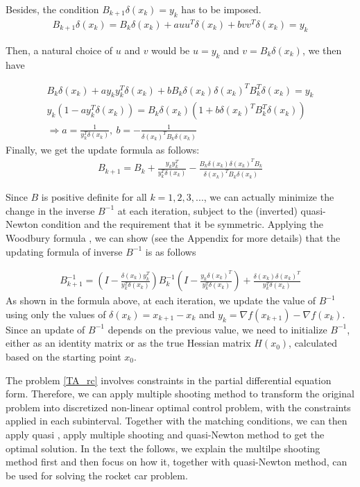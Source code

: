 Besides, the condition $B_{k+1}\delta(x_k) = y_k$ has to be imposed.
\begin{align*}
	B_{k+1}\delta(x_k) = B_k\delta(x_k)  + a u u^T\delta(x_k) + b v v^T\delta(x_k) = y_k
\end{align*}

Then, a natural choice of $u$ and $v$ would be $u=y_k$ and $v=B_k\delta(x_k)$, we then have

\begin{align*}
	B_k\delta(x_k) + a y_ky^T_k\delta(x_k) + bB_k\delta(x_k) \delta(x_k)^TB_k^T\delta(x_k) = y_k  \\
	y_k(1-ay_k^T\delta(x_k) ) = B_k\delta(x_k)(1+ b \delta(x_k)^TB_k^T\delta(x_k)) \\
	\Rightarrow a = \frac{1}{y_k^T\delta(x_k)}, \  b= - \frac{1}{\delta(x_k)^TB_k\delta(x_k)}
\end{align*}
Finally, we get the update formula as follows: 
\begin{align*}
	B_{k+1} = B_k +  \frac{y_ky_k^T}{y_k^T\delta(x_k)}  - \frac{B_k\delta(x_k)\delta(x_k)^TB_k}{\delta(x_k)^TB_k\delta(x_k)}
\end{align*}

Since $B$ is positive definite for all $k = 1,2, 3, ...$, we can actually minimize the change in the inverse $B^{-1}$ at each iteration, subject to the (inverted) quasi-Newton condition and the requirement that it be symmetric. Applying the Woodbury formula , we can show (see the Appendix for more details) that the updating formula of inverse $B^{-1}$ is as follows

\begin{align*}
	B_{k+1}^{-1} = (I - \frac{\delta(x_k)y_k^T}{y_k^T\delta(x_k)})B_k^{-1}(I - \frac{y_k\delta(x_k)^T}{y_k^T\delta(x_k)}) +  \frac{\delta(x_k)\delta(x_k)^T}{y_k^T\delta(x_k)} 
\end{align*}
As shown in the formula above, at each iteration, we update the value of $B^{-1}$ using only the values of $\delta(x_k) = x_{k+1} -x_k$ and $y_k = \nabla f(x_{k+1}) - \nabla f(x_k)$. Since an update of $B^{-1}$ depends on the previous value, we need to initialize $B^{-1}$, either as an identity matrix or as the true Hessian matrix $H(x_0)$, calculated based on the starting point $x_0$.

The problem \ref{TA_rc} involves constraints in the partial differential equation form. Therefore, we can apply multiple shooting method to transform the original problem into  discretized non-linear optimal control problem, with the constraints applied in each subinterval. Together with the matching conditions, we can then apply quasi  , apply multiple shooting and quasi-Newton method to get the optimal solution. In the text the follows, we explain the multilpe shooting method first and then focus on how it, together with quasi-Newton method, can be used for solving the rocket car problem.  

